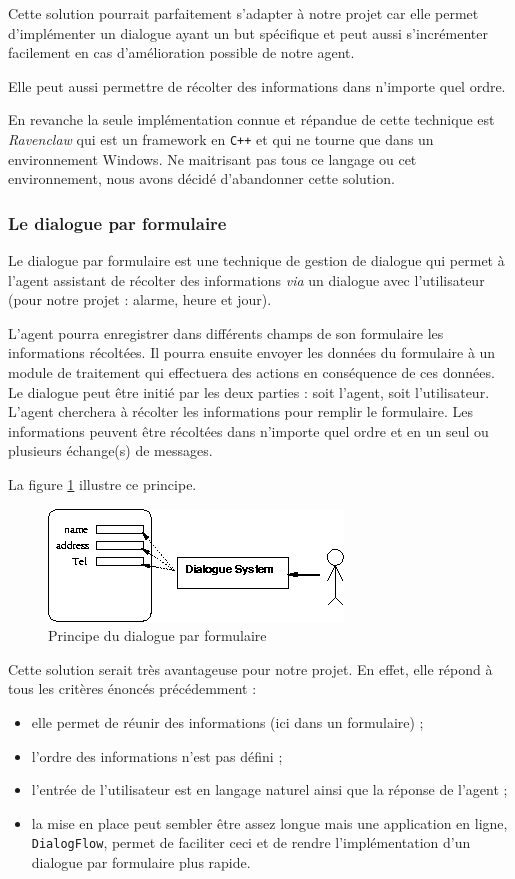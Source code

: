 \FloatBarrier

Cette solution pourrait parfaitement s'adapter à notre projet car elle permet d'implémenter un dialogue ayant un but spécifique et peut aussi s'incrémenter facilement en cas d'amélioration possible de notre agent. 

Elle peut aussi permettre de récolter des informations dans n'importe quel ordre. 

En revanche la seule implémentation connue et répandue de cette technique est \textit{Ravenclaw}\cite{ravenclaw} qui est un framework en \texttt{C++} et qui ne tourne que dans un environnement Windows. Ne maitrisant pas tous ce langage ou cet environnement, nous avons décidé d'abandonner cette solution. 

\subsubsection{Le dialogue par formulaire}
Le dialogue par formulaire est une technique de gestion de dialogue qui permet à l'agent assistant de récolter des informations \emph{via} un dialogue avec l'utilisateur (pour notre projet : alarme, heure et jour). 

L'agent pourra enregistrer dans différents champs de son formulaire les informations récoltées. Il pourra ensuite envoyer les données du formulaire à un module de traitement qui effectuera des actions en conséquence de ces données. Le dialogue peut être initié par les deux parties : soit l'agent, soit l'utilisateur. L'agent cherchera à récolter les informations pour remplir le formulaire. Les informations peuvent être récoltées dans n'importe quel ordre et en un seul ou plusieurs échange(s) de messages.

La figure \ref{form-dialog} illustre ce principe.
\begin{figure}[H]
\centering
    \includegraphics[scale=0.7]{images/slot.png} %
    \caption{Principe du dialogue par formulaire\cite{form-filling}}
    \label{form-dialog}
\end{figure}

Cette solution serait très avantageuse pour notre projet. 
En effet, elle répond à tous les critères énoncés précédemment : 
\begin{itemize}
    \item elle permet de réunir des informations (ici dans un formulaire) ;
    \item l'ordre des informations n'est pas défini ;
    \item l'entrée de l'utilisateur est en langage naturel ainsi que la réponse de l'agent ;
    \item la mise en place peut sembler être assez longue mais une application en ligne, \texttt{DialogFlow}, permet de faciliter ceci et de rendre l'implémentation d'un dialogue par formulaire plus rapide.
\end{itemize}
\FloatBarrier


